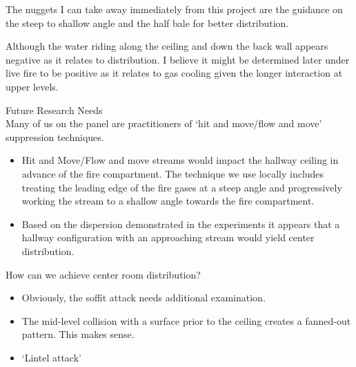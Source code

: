 \documentclass[12pt,oneside]{book}
\begin{document}
\begin{appendix}
The nuggets I can take away immediately from this project are the guidance on the steep to shallow angle and the half bale for better distribution.
 
Although the water riding along the ceiling and down the back wall appears negative as it relates to distribution. I believe it might be determined later under live fire to be positive as it relates to gas cooling given the longer interaction at upper levels.

Future Research Needs \\
Many of us on the panel are practitioners of `hit and move/flow and move' suppression techniques.
\begin{itemize}
\item Hit and Move/Flow and move streams would impact the hallway ceiling in advance of the fire compartment. The technique we use locally includes treating the leading edge of the fire gases at a steep angle and progressively working the stream to a shallow angle towards the fire compartment. 
\item Based on the dispersion demonstrated in the experiments it appears that a hallway configuration with an approaching stream would yield center distribution. 
\end{itemize}

How can we achieve center room distribution?
\begin{itemize}
	\item Obviously, the soffit attack needs additional examination.
	\item The mid-level collision with a surface prior to the ceiling creates a fanned-out pattern. This makes sense.
	\item `Lintel attack'
\end{itemize}
 

\end{appendix}
\end{document}
